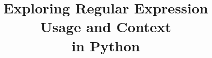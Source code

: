 \documentclass{sig-alternate-05-2015}
\begin{document}
%
\title{Exploring  Regular Expression Usage and Context\\ in Python}



\maketitle
\end{document}
